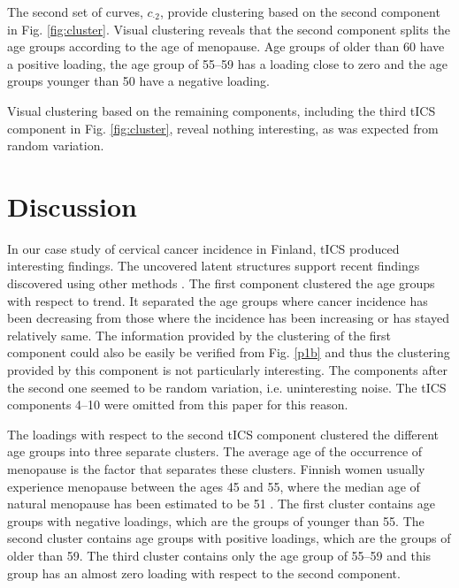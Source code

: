 \documentclass{llncs}
\begin{document}
The second set of curves, $c_{\cdot2}$, provide  clustering based on the second component in Fig. \ref{fig:cluster}. Visual clustering  reveals that the second component splits the age groups according to the age of menopause. Age groups of older than 60 have a positive loading, the age group of 55--59 has a loading close to zero and the age groups younger than 50 have a negative loading. 

Visual clustering based on the remaining components, including the third tICS component in Fig. \ref{fig:cluster}, reveal nothing interesting, as was expected from random variation.










\section{Discussion}\label{disc}

In our case study of cervical cancer incidence in Finland, tICS  produced interesting findings. 
The uncovered latent structures support recent findings discovered using other methods \cite{JP3}. The first component clustered the age groups with respect to trend. It separated the age groups where cancer incidence has been decreasing from those where the incidence  has been increasing or has stayed relatively same. The information provided by the clustering of the first component could also be easily be verified from Fig. \ref{p1b} and thus the clustering provided by this component is not particularly interesting. The components after the second one seemed to be random variation, i.e. uninteresting noise. The tICS components 4--10 were omitted from this paper for this reason.



The loadings with respect to the second tICS component clustered the different age groups into three separate clusters. The average age of the occurrence of menopause is the factor that separates these clusters. Finnish women usually experience menopause between the ages 45 and 55, where the median age of natural menopause has been estimated to be 51 \cite{pakarinen2010}. The first cluster contains age groups with negative loadings, which are the groups of younger than 55. The second cluster contains age groups with positive loadings, which are the groups of older than 59.  The third cluster contains only the age group of 55--59 and this group has an almost zero loading with respect to the second component.
\end{document}
